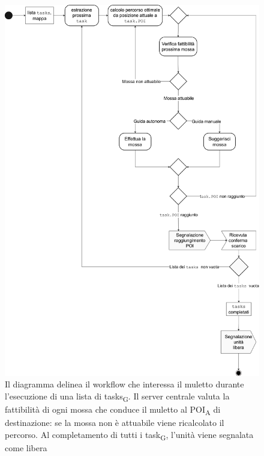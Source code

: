 \begin{figure}[H]
	\centering
	\includegraphics[scale=0.37]{res/images/diagramma_di_attivita2.png}
	\caption[Diagramma di attività per l'evasione di una lista di \glspl{task}\textsubscript{G} da parte di un muletto]{Il diagramma delinea il workflow che interessa il muletto durante l'esecuzione di una lista di \glspl{task}\textsubscript{G}. Il server centrale valuta la fattibilità di ogni mossa che conduce il muletto al \acrshort{POI}\textsubscript{A} di destinazione: se la mossa non è attuabile viene ricalcolato il percorso. Al completamento di tutti i \gls{task}\textsubscript{G}, l'unità viene segnalata come libera}
\end{figure}





